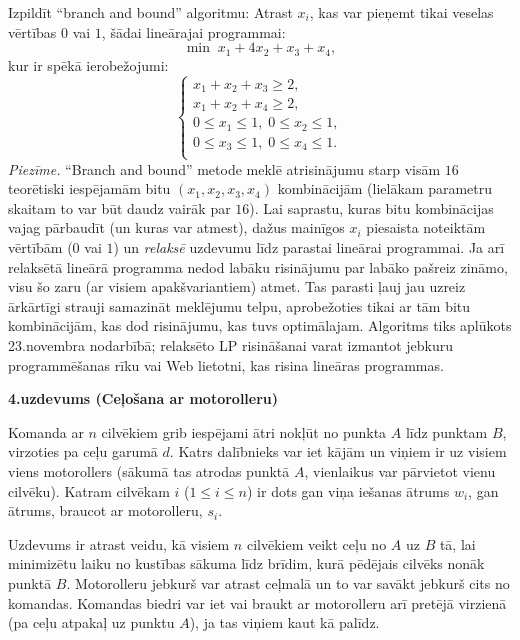 \documentclass[a4paper,12pt]{article}
\begin{document}
Izpildīt ``branch and bound'' algoritmu: Atrast $x_i$, 
kas var pieņemt tikai veselas vērtības $0$ vai $1$, šādai lineārajai
programmai:
$$\min\;x_1 + 4x_2 + x_3 + x_4,$$
kur ir spēkā ierobežojumi: 
$$\left\{ \begin{array}{l} 
x_1 + x_2 + x_3 \geq 2,\\
x_1 + x_2 + x_4 \geq 2,\\
0 \leq x_1 \leq 1,\; 0 \leq x_2 \leq 1,\\
0 \leq x_3 \leq 1,\;0 \leq x_4 \leq 1.\\
\end{array} \right.$$
{\footnotesize
{\em Piezīme.} ``Branch and bound'' metode meklē atrisinājumu 
starp visām $16$ teorētiski iespējamām bitu $(x_1,x_2,x_3,x_4)$ 
kombinācijām (lielākam parametru skaitam to var būt daudz vairāk par $16$). 
Lai saprastu, kuras bitu kombinācijas vajag pārbaudīt (un kuras var atmest), 
dažus mainīgos $x_i$ piesaista noteiktām vērtībām ($0$ vai $1$) un 
{\em relaksē} uzdevumu līdz parastai lineārai programmai. 
Ja arī relaksētā lineārā programma nedod labāku risinājumu par labāko pašreiz zināmo, 
visu šo zaru (ar visiem apakšvariantiem) atmet. 
Tas parasti ļauj jau uzreiz ārkārtīgi strauji samazināt meklējumu telpu, 
aprobežoties tikai ar tām bitu kombinācijām, kas dod risinājumu, kas tuvs optimālajam. 
Algoritms tiks aplūkots 23.novembra nodarbībā; relaksēto LP risināšanai varat izmantot
jebkuru programmēšanas rīku vai Web lietotni, kas risina lineāras programmas.
}

 







\vspace{20pt}
{\bf 4.uzdevums (Ceļošana ar motorolleru)}

Komanda ar $n$ cilvēkiem grib iespējami 
ātri no\-kļūt no punkta $A$ līdz punktam $B$, 
virzoties pa ceļu garumā $d$. 
Katrs dalībnieks var iet kājām un viņiem ir uz visiem 
viens motorollers (sākumā tas atrodas punktā $A$,  
vienlaikus var pārvietot vienu cilvēku). 
Katram cilvēkam $i$ ($1 \leq i \leq n$) 
ir dots gan viņa iešanas ātrums $w_i$, 
gan ātrums, braucot ar motorolleru, $s_i$.

Uzdevums ir atrast veidu, kā visiem $n$ cilvēkiem veikt ceļu
no $A$ uz $B$ tā, lai minimizētu laiku no kustības sākuma 
līdz brīdim, kurā pēdējais cilvēks nonāk punktā $B$. 
Motorolleru jebkurš var 
atrast ceļmalā un to var savākt jebkurš cits no komandas. 
Komandas biedri var iet vai braukt ar 
motorolleru arī pretējā virzienā (pa ceļu 
atpakaļ uz punktu $A$), ja tas viņiem kaut kā palīdz.
\end{document}
